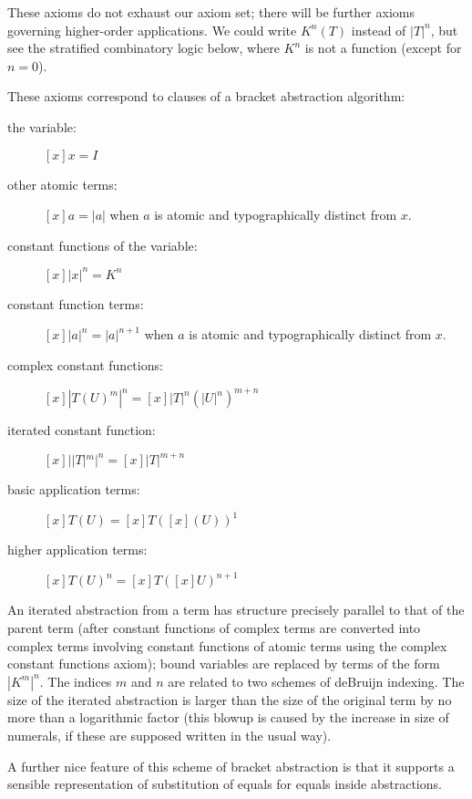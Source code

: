 \documentclass{article}
\begin{document}
These axioms do not exhaust our axiom set; there will be further
axioms governing higher-order applications.  We could write $K^n(T)$
instead of $|T|^n$, but see the stratified combinatory logic below,
where $K^n$ is not a function (except for $n=0$).

These axioms correspond to clauses of a bracket abstraction algorithm:

\begin{description}

\item[the variable:] $[x]x=I$

\item[other atomic terms:]  $[x]a = |a|$ when $a$ is atomic and typographically distinct from $x$.

\item[constant functions of the variable:]  $[x]|x|^n=K^n$

\item[constant function terms:]  $[x]|a|^n = |a|^{n+1}$ when $a$ is atomic and typographically distinct from $x$.

\item[complex constant functions:] $[x]|T(U)^m|^n = [x]|T|^n(|U|^n)^{m+n}$

\item[iterated constant function:] $[x]||T|^m|^n = [x]|T|^{m+n}$

\item[basic application terms:]  $[x]T(U) = [x]T([x](U))^1$

\item[higher application terms:] $[x]T(U)^n = [x]T([x]U)^{n+1}$

\end{description}

An iterated abstraction from a term has structure precisely parallel
to that of the parent term (after constant functions of complex terms
are converted into complex terms involving constant functions of
atomic terms using the complex constant functions axiom); bound
variables are replaced by terms of the form $|K^m|^n$.  The indices
$m$ and $n$ are related to two schemes of deBruijn indexing.  The size
of the iterated abstraction is larger than the size of the original
term by no more than a logarithmic factor (this blowup is caused by
the increase in size of numerals, if these are supposed written in the
usual way).

A further nice feature of this scheme of bracket abstraction is that
it supports a sensible representation of substitution of equals for equals
inside abstractions.
\end{document}
